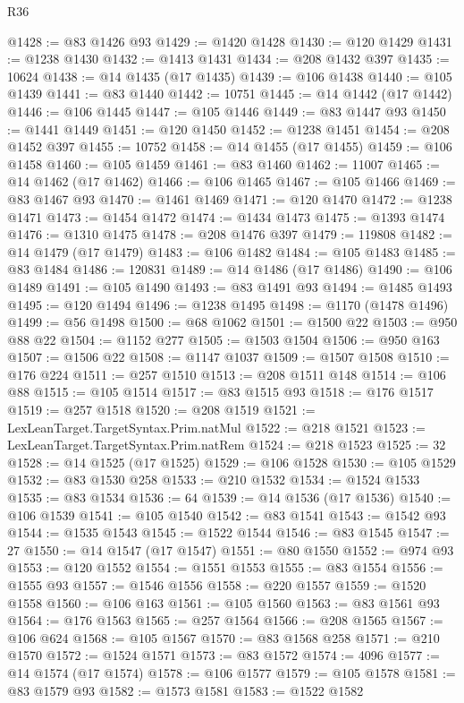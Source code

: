 \begin{lexlean}{R36}
\begin{coremodule}
@1428 := @83 @1426 @93
@1429 := @1420 @1428
@1430 := @120 @1429
@1431 := @1238 @1430
@1432 := @1413 @1431
@1434 := @208 @1432 @397
@1435 := 10624
@1438 := @14 @1435 (@17 @1435)
@1439 := @106 @1438
@1440 := @105 @1439
@1441 := @83 @1440
@1442 := 10751
@1445 := @14 @1442 (@17 @1442)
@1446 := @106 @1445
@1447 := @105 @1446
@1449 := @83 @1447 @93
@1450 := @1441 @1449
@1451 := @120 @1450
@1452 := @1238 @1451
@1454 := @208 @1452 @397
@1455 := 10752
@1458 := @14 @1455 (@17 @1455)
@1459 := @106 @1458
@1460 := @105 @1459
@1461 := @83 @1460
@1462 := 11007
@1465 := @14 @1462 (@17 @1462)
@1466 := @106 @1465
@1467 := @105 @1466
@1469 := @83 @1467 @93
@1470 := @1461 @1469
@1471 := @120 @1470
@1472 := @1238 @1471
@1473 := @1454 @1472
@1474 := @1434 @1473
@1475 := @1393 @1474
@1476 := @1310 @1475
@1478 := @208 @1476 @397
@1479 := 119808
@1482 := @14 @1479 (@17 @1479)
@1483 := @106 @1482
@1484 := @105 @1483
@1485 := @83 @1484
@1486 := 120831
@1489 := @14 @1486 (@17 @1486)
@1490 := @106 @1489
@1491 := @105 @1490
@1493 := @83 @1491 @93
@1494 := @1485 @1493
@1495 := @120 @1494
@1496 := @1238 @1495
@1498 := @1170 (@1478 @1496)
@1499 := @56 @1498
@1500 := @68 @1062
@1501 := @1500 @22
@1503 := @950 @88 @22
@1504 := @1152 @277
@1505 := @1503 @1504
@1506 := @950 @163
@1507 := @1506 @22
@1508 := @1147 @1037
@1509 := @1507 @1508
@1510 := @176 @224
@1511 := @257 @1510
@1513 := @208 @1511 @148
@1514 := @106 @88
@1515 := @105 @1514
@1517 := @83 @1515 @93
@1518 := @176 @1517
@1519 := @257 @1518
@1520 := @208 @1519
@1521 := LexLeanTarget.TargetSyntax.Prim.natMul
@1522 := @218 @1521
@1523 := LexLeanTarget.TargetSyntax.Prim.natRem
@1524 := @218 @1523
@1525 := 32
@1528 := @14 @1525 (@17 @1525)
@1529 := @106 @1528
@1530 := @105 @1529
@1532 := @83 @1530 @258
@1533 := @210 @1532
@1534 := @1524 @1533
@1535 := @83 @1534
@1536 := 64
@1539 := @14 @1536 (@17 @1536)
@1540 := @106 @1539
@1541 := @105 @1540
@1542 := @83 @1541
@1543 := @1542 @93
@1544 := @1535 @1543
@1545 := @1522 @1544
@1546 := @83 @1545
@1547 := 27
@1550 := @14 @1547 (@17 @1547)
@1551 := @80 @1550
@1552 := @974 @93
@1553 := @120 @1552
@1554 := @1551 @1553
@1555 := @83 @1554
@1556 := @1555 @93
@1557 := @1546 @1556
@1558 := @220 @1557
@1559 := @1520 @1558
@1560 := @106 @163
@1561 := @105 @1560
@1563 := @83 @1561 @93
@1564 := @176 @1563
@1565 := @257 @1564
@1566 := @208 @1565
@1567 := @106 @624
@1568 := @105 @1567
@1570 := @83 @1568 @258
@1571 := @210 @1570
@1572 := @1524 @1571
@1573 := @83 @1572
@1574 := 4096
@1577 := @14 @1574 (@17 @1574)
@1578 := @106 @1577
@1579 := @105 @1578
@1581 := @83 @1579 @93
@1582 := @1573 @1581
@1583 := @1522 @1582

\end{coremodule}
\end{lexlean}
